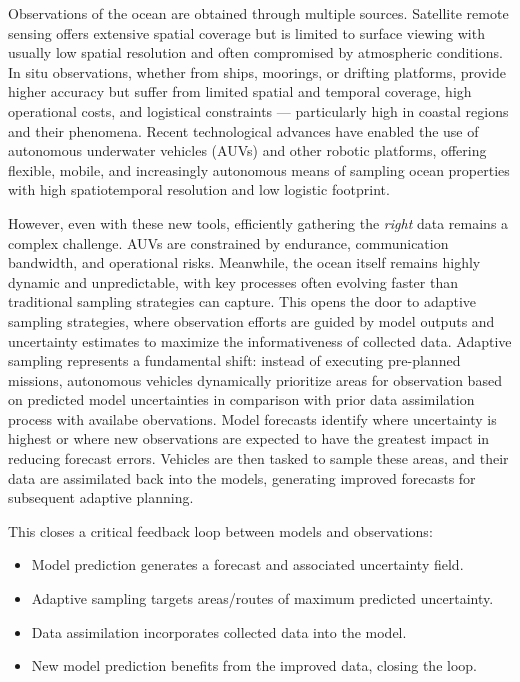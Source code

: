 Observations of the ocean are obtained through multiple sources. Satellite remote sensing offers extensive spatial coverage but is limited to surface viewing with usually low spatial resolution and often compromised by atmospheric conditions. In situ observations, whether from ships, moorings, or drifting platforms, provide higher accuracy but suffer from limited spatial and temporal coverage, high operational costs, and logistical constraints — particularly high in coastal regions and their phenomena. Recent technological advances have enabled the use of autonomous underwater vehicles (AUVs) and other robotic platforms, offering flexible, mobile, and increasingly autonomous means of sampling ocean properties with high spatiotemporal resolution and low logistic footprint.

However, even with these new tools, efficiently gathering the \textit{right} data remains a complex challenge. AUVs are constrained by endurance, communication bandwidth, and operational risks. Meanwhile, the ocean itself remains highly dynamic and unpredictable, with key processes often evolving faster than traditional sampling strategies can capture. This opens the door to adaptive sampling strategies, where observation efforts are guided by model outputs and uncertainty estimates to maximize the informativeness of collected data. Adaptive sampling represents a fundamental shift: instead of executing pre-planned missions, autonomous vehicles dynamically prioritize areas for observation based on predicted model uncertainties in comparison with prior data assimilation process with availabe obervations. Model forecasts identify where uncertainty is highest or where new observations are expected to have the greatest impact in reducing forecast errors. Vehicles are then tasked to sample these areas, and their data are assimilated back into the models, generating improved forecasts for subsequent adaptive planning.

This closes a critical feedback loop between models and observations:
\begin{itemize}
    \item Model prediction generates a forecast and associated uncertainty field.
    \item Adaptive sampling targets areas/routes of maximum predicted uncertainty.
    \item Data assimilation incorporates collected data into the model.
    \item New model prediction benefits from the improved data, closing the loop.
\end{itemize}

